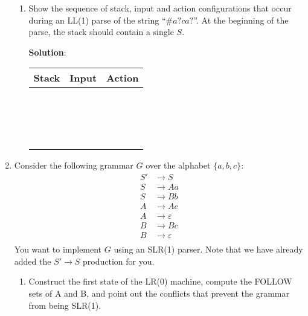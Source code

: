 \documentclass[11pt]{article}
\let\epsilon\varepsilon
\begin{document}
\begin{enumerate}
\begin{enumerate}
  \item Show the sequence of stack, input and action configurations that occur during an LL(1) parse of the string ``$\# a?ca?$''. At the beginning of the parse, the stack should contain a single $S$.

    \textbf{Solution}:
    \begin{center}
      \begin{tabular}{R{10em}|R{10em}|L{10em}}
        Stack & Input & Action \\
        \hline
        & & \\
        & & \\
        & & \\
        & & \\
        & & \\
        & & \\
        & & \\
        & & \\
        & & \\
        & & \\
        & & \\
        & & \\
        & & \\
        & & \\
        & & \\
        & & \\
        & & \\
      \end{tabular}
    \end{center}
  \end{enumerate}

  \newpage

\item Consider the following grammar $G$ over the alphabet $\{a,b,c\}$:
  \begin{equation*}
    \begin{split}
      S' &\to S \\
      S &\to Aa \\
      S &\to Bb \\
      A &\to Ac \\
      A &\to \epsilon\\
      B &\to Bc \\
      B &\to \epsilon \\
    \end{split}
  \end{equation*}
  You want to implement $G$ using an SLR(1) parser. Note that we have already added the $S' \to S$ production for you.
  \begin{enumerate}
  \item Construct the first state of the LR(0) machine, compute the FOLLOW sets of A and B, and point out the conflicts that prevent the grammar from being SLR(1).


\end{enumerate}
\end{enumerate}
\end{document}
